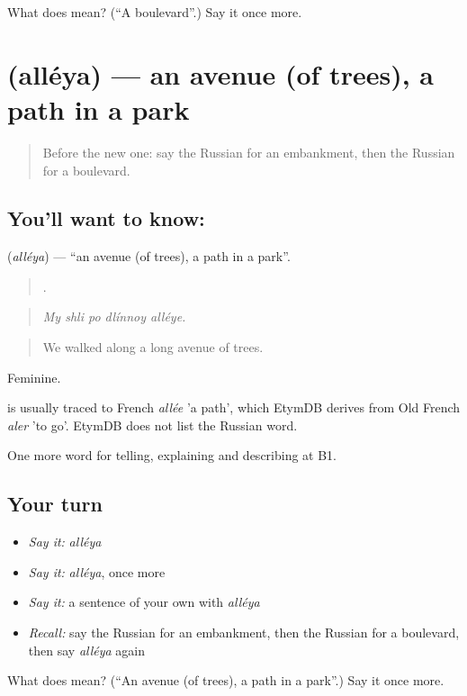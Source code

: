 \begin{tcolorbox}[breakable,colback=teal!4,colframe=teal!35!black,title={Before you move on}]
What does  mean? (\textquotedblleft{}A boulevard\textquotedblright{}.) Say it once more.
\end{tcolorbox}
\section[\texorpdfstring{\ru{аллея} (alléya)}{аллея (alléya)}]{ (alléya) — an avenue (of trees), a path in a park}

\label{lesson:RU-C440-alleya}



\begin{quote}
Before the new one: say the Russian for an embankment, then the Russian for a boulevard.
\end{quote}

\subsection*{You'll want to know: }
\textbf{} (\emph{alléya}) — \textquotedblleft{}an avenue (of trees), a path in a park\textquotedblright{}.

\begin{quote}
    .
\end{quote}

\begin{quote}
\emph{My shli po dlínnoy alléye.}
\end{quote}

\begin{quote}
We walked along a long avenue of trees.
\end{quote}

Feminine.

\begin{cousinweb}
\emph{} is usually traced to French \emph{allée} 'a path', which EtymDB derives from Old French \emph{aler} 'to go'. EtymDB does not list the Russian word.
\end{cousinweb}

\begin{grammarlens}[title={What you've built}]
One more word for telling, explaining and describing at B1.
\end{grammarlens}

\subsection*{Your turn}
\begin{itemize}
\raggedright
  \item \emph{Say it:} \emph{alléya}
  \item \emph{Say it:} \emph{alléya}, once more
  \item \emph{Say it:} a sentence of your own with \emph{alléya}
  \item \emph{Recall:} say the Russian for an embankment, then the Russian for a boulevard, then say \emph{alléya} again
\end{itemize}

\begin{tcolorbox}[breakable,colback=teal!4,colframe=teal!35!black,title={Before you move on}]
What does  mean? (\textquotedblleft{}An avenue (of trees), a path in a park\textquotedblright{}.) Say it once more.
\end{tcolorbox}
